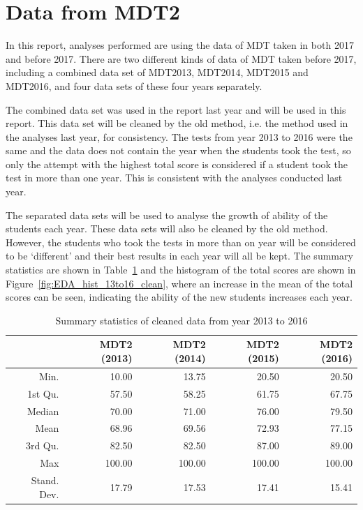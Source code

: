 \documentclass[a4paper]{report}
\begin{document}
\section{Data from MDT2}

In this report, analyses performed are using the data of MDT taken in both 2017 and before 2017. There are two different kinds of data of MDT taken before 2017, including a combined data set of MDT2013, MDT2014, MDT2015 and MDT2016, and four data sets of these four years separately. 

The combined data set was used in the report last year and will be used in this report. This data set will be cleaned by the old method, i.e. the method used in the analyses last year, for consistency. The tests from year 2013 to 2016 were the same and the data does not contain the year when the students took the test, so only the attempt with the highest total score is considered if a student took the test in more than one year. This is consistent with the analyses conducted last year. 

The separated data sets will be used to analyse the growth of ability of the students each year. These data sets will also be cleaned by the old method. However, the students who took the tests in more than on year will be considered to be `different' and their best results in each year will all be kept. The summary statistics are shown in Table~\ref{tab:EDA_dsc_13to16_clean} and the histogram of the total scores are shown in Figure~\ref{fig:EDA_hist_13to16_clean}, where an increase in the mean of the total scores can be seen, indicating the ability of the new students increases each year. 

\begin{table}[ht]
  \centering
  \begin{tabular}{rrrrr}
    \hline
    & MDT2 (2013) & MDT2 (2014) & MDT2 (2015) & MDT2 (2016) \\ 
    \hline
  Min. & 10.00 & 13.75 & 20.50 & 20.50 \\ 
    1st Qu. & 57.50 & 58.25 & 61.75 & 67.75 \\ 
    Median & 70.00 & 71.00 & 76.00 & 79.50 \\ 
    Mean & 68.96 & 69.56 & 72.93 & 77.15 \\ 
    3rd Qu. & 82.50 & 82.50 & 87.00 & 89.00 \\ 
    Max & 100.00 & 100.00 & 100.00 & 100.00 \\ 
    Stand. Dev. & 17.79 & 17.53 & 17.41 & 15.41 \\ 
     \hline
  \end{tabular}
  \caption{\label{tab:EDA_dsc_13to16_clean}Summary statistics of cleaned data from year 2013 to 2016}
\end{table}
\end{document}
